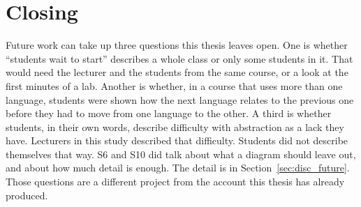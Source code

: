 \section{Closing}
\label{sec:conc_closing}

Future work can take up three questions this thesis leaves open. One is whether ``students wait to start'' describes a whole class or only some students in it. That would need the lecturer and the students from the same course, or a look at the first minutes of a lab. Another is whether, in a course that uses more than one language, students were shown how the next language relates to the previous one before they had to move from one language to the other. A third is whether students, in their own words, describe difficulty with abstraction as a lack they have. Lecturers in this study described that difficulty. Students did not describe themselves that way. S6 and S10 did talk about what a diagram should leave out, and about how much detail is enough. The detail is in Section~\ref{sec:disc_future}. Those questions are a different project from the account this thesis has already produced.
